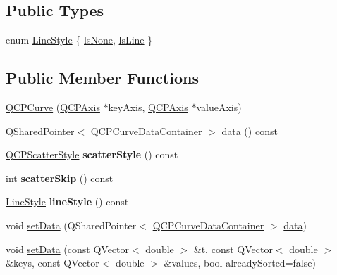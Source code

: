 \subsection*{Public Types}
\begin{DoxyCompactItemize}
\item 
enum \hyperlink{classQCPCurve_a2710e9f79302152cff794c6e16cc01f1}{Line\+Style} \{ \hyperlink{classQCPCurve_a2710e9f79302152cff794c6e16cc01f1aec1601a191cdf0b4e761c4c66092cc48}{ls\+None}, 
\hyperlink{classQCPCurve_a2710e9f79302152cff794c6e16cc01f1ade5822ce6fbf131d3df131795c2e1003}{ls\+Line}
 \}
\end{DoxyCompactItemize}
\subsection*{Public Member Functions}
\begin{DoxyCompactItemize}
\item 
\hyperlink{classQCPCurve_a36de58e2652b3fa47bdf9187d421d3ce}{Q\+C\+P\+Curve} (\hyperlink{classQCPAxis}{Q\+C\+P\+Axis} $\ast$key\+Axis, \hyperlink{classQCPAxis}{Q\+C\+P\+Axis} $\ast$value\+Axis)
\item 
Q\+Shared\+Pointer$<$ \hyperlink{classQCPDataContainer}{Q\+C\+P\+Curve\+Data\+Container} $>$ \hyperlink{classQCPCurve_a761492fd00b1ab7cb18ce23c118c6c60}{data} () const
\item 
\mbox{\label{classQCPCurve_afa6bd72a3a331a5ed45d3e0c5843b592}} 
\hyperlink{classQCPScatterStyle}{Q\+C\+P\+Scatter\+Style} {\bfseries scatter\+Style} () const
\item 
\mbox{\label{classQCPCurve_a09b33217172aedf6c62c441b4ff66166}} 
int {\bfseries scatter\+Skip} () const
\item 
\mbox{\label{classQCPCurve_a06e3cf3f8f1add689254b3cda66e040e}} 
\hyperlink{classQCPCurve_a2710e9f79302152cff794c6e16cc01f1}{Line\+Style} {\bfseries line\+Style} () const
\item 
void \hyperlink{classQCPCurve_a41246850d2e080bc57183ca19cd4135e}{set\+Data} (Q\+Shared\+Pointer$<$ \hyperlink{classQCPDataContainer}{Q\+C\+P\+Curve\+Data\+Container} $>$ \hyperlink{classQCPCurve_a761492fd00b1ab7cb18ce23c118c6c60}{data})
\item 
void \hyperlink{classQCPCurve_a0768af2c33c8dcffa3cf5bdeb53923a6}{set\+Data} (const Q\+Vector$<$ double $>$ \&t, const Q\+Vector$<$ double $>$ \&keys, const Q\+Vector$<$ double $>$ \&values, bool already\+Sorted=false)

\end{DoxyCompactItemize}
